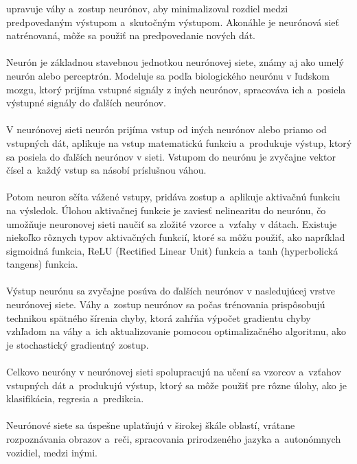     upravuje váhy a~zostup neurónov, aby minimalizoval rozdiel medzi predpovedaným výstupom a~skutočným výstupom.
    Akonáhle je neurónová sieť natrénovaná, môže sa použiť na predpovedanie nových dát.\\
    \\
    Neurón je základnou stavebnou jednotkou neurónovej siete, známy aj ako umelý neurón alebo perceptrón.
    Modeluje sa podľa biologického neurónu v ľudskom mozgu, ktorý prijíma vstupné signály z iných neurónov,
    spracováva ich a~posiela výstupné signály do ďalších neurónov.\\
    \\
    V neurónovej sieti neurón prijíma vstup od iných neurónov alebo priamo od vstupných dát, aplikuje na vstup
    matematickú funkciu a~produkuje výstup, ktorý sa posiela do ďalších neurónov v sieti. Vstupom do neurónu je
    zvyčajne vektor čísel a~každý vstup sa násobí príslušnou váhou.\\
    \\
    Potom neuron sčíta vážené vstupy, pridáva zostup a~aplikuje aktivačnú funkciu na výsledok. Úlohou aktivačnej
    funkcie je zaviesť nelinearitu do neurónu, čo umožňuje neuronovej sieti naučiť sa zložité vzorce a~vzťahy v dátach.
    Existuje niekoľko rôznych typov aktivačných funkcií, ktoré sa môžu použiť, ako napríklad sigmoidná funkcia,
    ReLU (Rectified Linear Unit) funkcia a~tanh (hyperbolická tangens) funkcia.\\
    \\
    Výstup neurónu sa zvyčajne posúva do ďalších neurónov v nasledujúcej vrstve neurónovej siete. Váhy a~zostup
    neurónov sa počas trénovania prispôsobujú technikou spätného šírenia chyby, ktorá zahŕňa výpočet gradientu chyby
    vzhľadom na váhy a~ich aktualizovanie pomocou optimalizačného algoritmu, ako je stochastický gradientný zostup.\\
    \\
    Celkovo neuróny v neurónovej sieti spolupracujú na učení sa vzorcov a~vzťahov vstupných dát a~produkujú výstup,
    ktorý sa môže použiť pre rôzne úlohy, ako je klasifikácia, regresia a~predikcia.\\
    \\
    Neurónové siete sa úspešne uplatňujú v širokej škále oblastí, vrátane rozpoznávania obrazov a~reči, spracovania
    prirodzeného jazyka a~autonómnych vozidiel, medzi inými.

